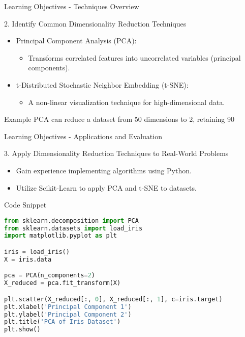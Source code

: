 \documentclass[aspectratio=169]{beamer}
\begin{document}
\begin{frame}[fragile]{Learning Objectives - Techniques Overview}
    \begin{block}{2. Identify Common Dimensionality Reduction Techniques}
        \begin{itemize}
            \item Principal Component Analysis (PCA):
                \begin{itemize}
                    \item Transforms correlated features into uncorrelated variables (principal components).
                \end{itemize}
            \item t-Distributed Stochastic Neighbor Embedding (t-SNE):
                \begin{itemize}
                    \item A non-linear visualization technique for high-dimensional data.
                \end{itemize}
        \end{itemize}
        \begin{block}{Example}
            PCA can reduce a dataset from 50 dimensions to 2, retaining 90%
        \end{block}
    \end{block}
\end{frame}

\begin{frame}[fragile]{Learning Objectives - Applications and Evaluation}
    \begin{block}{3. Apply Dimensionality Reduction Techniques to Real-World Problems}
        \begin{itemize}
            \item Gain experience implementing algorithms using Python.
            \item Utilize Scikit-Learn to apply PCA and t-SNE to datasets.
        \end{itemize}
        \begin{block}{Code Snippet}
            \begin{lstlisting}[language=Python]
from sklearn.decomposition import PCA
from sklearn.datasets import load_iris
import matplotlib.pyplot as plt

iris = load_iris()
X = iris.data

pca = PCA(n_components=2)
X_reduced = pca.fit_transform(X)

plt.scatter(X_reduced[:, 0], X_reduced[:, 1], c=iris.target)
plt.xlabel('Principal Component 1')
plt.ylabel('Principal Component 2')
plt.title('PCA of Iris Dataset')
plt.show()
            \end{lstlisting}
        \end{block}
    \end{block}
\end{frame}
\end{document}
